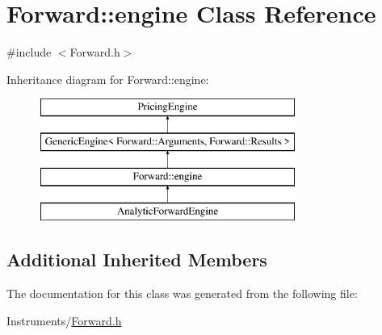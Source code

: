 \hypertarget{class_forward_1_1engine}{}\section{Forward\+:\+:engine Class Reference}
\label{class_forward_1_1engine}


{\ttfamily \#include $<$Forward.\+h$>$}

Inheritance diagram for Forward\+:\+:engine\+:\begin{figure}[H]
\begin{center}
\leavevmode
\includegraphics[height=4.000000cm]{class_forward_1_1engine}
\end{center}
\end{figure}
\subsection*{Additional Inherited Members}


The documentation for this class was generated from the following file\+:\begin{DoxyCompactItemize}
\item 
Instruments/\hyperlink{_forward_8h}{Forward.\+h}\end{DoxyCompactItemize}
